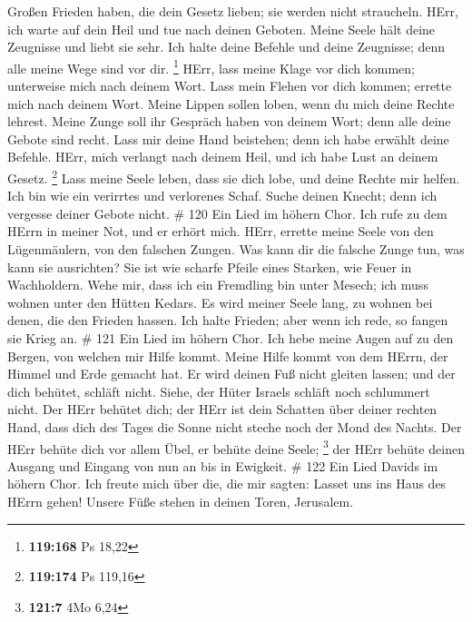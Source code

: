 Großen Frieden haben, die dein Gesetz lieben; sie werden
nicht straucheln.  HErr, ich warte auf dein Heil und tue
nach deinen Geboten.  Meine Seele hält deine Zeugnisse und
liebt sie sehr.  Ich halte deine Befehle und deine
Zeugnisse; denn alle meine Wege sind vor dir. \footnote{\textbf{119:168}
  Ps 18,22}  HErr, lass meine Klage vor dich kommen;
unterweise mich nach deinem Wort.  Lass mein Flehen vor
dich kommen; errette mich nach deinem Wort.  Meine Lippen
sollen loben, wenn du mich deine Rechte lehrest.  Meine
Zunge soll ihr Gespräch haben von deinem Wort; denn alle deine Gebote
sind recht.  Lass mir deine Hand beistehen; denn ich habe
erwählt deine Befehle.  HErr, mich verlangt nach deinem
Heil, und ich habe Lust an deinem Gesetz. \footnote{\textbf{119:174} Ps
  119,16}  Lass meine Seele leben, dass sie dich lobe, und
deine Rechte mir helfen.  Ich bin wie ein verirrtes und
verlorenes Schaf. Suche deinen Knecht; denn ich vergesse deiner Gebote
nicht. \# 120  Ein Lied im höhern Chor. Ich rufe zu dem
HErrn in meiner Not, und er erhört mich.  HErr, errette
meine Seele von den Lügenmäulern, von den falschen Zungen. 
Was kann dir die falsche Zunge tun, was kann sie ausrichten?
 Sie ist wie scharfe Pfeile eines Starken, wie Feuer in
Wachholdern.  Wehe mir, dass ich ein Fremdling bin unter
Mesech; ich muss wohnen unter den Hütten Kedars.  Es wird
meiner Seele lang, zu wohnen bei denen, die den Frieden hassen.
 Ich halte Frieden; aber wenn ich rede, so fangen sie Krieg
an. \# 121  Ein Lied im höhern Chor. Ich hebe meine Augen
auf zu den Bergen, von welchen mir Hilfe kommt.  Meine Hilfe
kommt von dem HErrn, der Himmel und Erde gemacht hat.  Er
wird deinen Fuß nicht gleiten lassen; und der dich behütet, schläft
nicht.  Siehe, der Hüter Israels schläft noch schlummert
nicht.  Der HErr behütet dich; der HErr ist dein Schatten
über deiner rechten Hand,  dass dich des Tages die Sonne
nicht steche noch der Mond des Nachts.  Der HErr behüte dich
vor allem Übel, er behüte deine Seele; \footnote{\textbf{121:7} 4Mo 6,24}
 der HErr behüte deinen Ausgang und Eingang von nun an bis
in Ewigkeit. \# 122  Ein Lied Davids im höhern Chor. Ich
freute mich über die, die mir sagten: Lasset uns ins Haus des HErrn
gehen!  Unsere Füße stehen in deinen Toren, Jerusalem.
